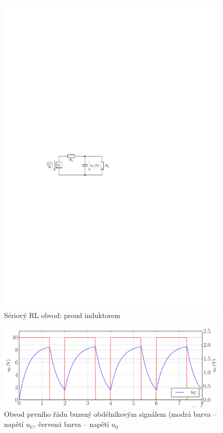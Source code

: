 \begin{figure}[h!]
\centering
\includegraphics[]{prechodne_jevy/specialni/rc_obdelnik.pdf}
\caption{Sériový RL obvod: proud induktorem}
\label{fig:rc_proud}
\end{figure}

\begin{figure}[h!]
\centering
\includegraphics[width=13cm]{prechodne_jevy/specialni/obvod_rc_obdelnik.pdf}
\caption{Obvod prvního řádu buzený obdélníkovým signálem (modrá barva -- napětí $u_\mathrm{C}$, červená barva -- napětí $u_\mathrm{0}$}
\label{fig:obvod_rc_napeti}
\end{figure}
